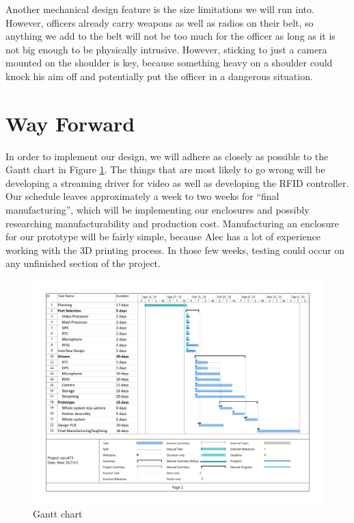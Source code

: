 \documentclass[12pt]{article}
\begin{document}
Another mechanical design feature is the size limitations we will run into.
However, officers already carry weapons as well as radios on their belt, so
anything we add to the belt will not be too much for the officer as long as it
is not big enough to be physically intrusive. However, sticking to just a
camera mounted on the shoulder is key, because something heavy on a shoulder
could knock his aim off and potentially put the officer in a dangerous
situation. 

\section{Way Forward}

In order to implement our design, we will adhere as closely as possible to the
Gantt chart in Figure \ref{fig:gantt}. The things that are most likely to go
wrong will be developing a streaming driver for video as well as developing the
RFID controller. Our schedule leaves approximately a week to two weeks for
``final manufacturing'', which will be implementing our enclosures and possibly
researching manufacturability and production cost. Manufacturing an enclosure
for our prototype will be fairly simple, because Alec has a lot of experience
working with the 3D printing process. In those few weeks, testing could occur
on any unfinished section of the project. 

\begin{landscape}
    \thispagestyle{empty}

    \begin{figure}[h!]
        \centering
        \includegraphics[width=1.2\textwidth]{gantt}
        \caption{Gantt chart}
        \label{fig:gantt}
    \end{figure}
\end{landscape}
\end{document}
